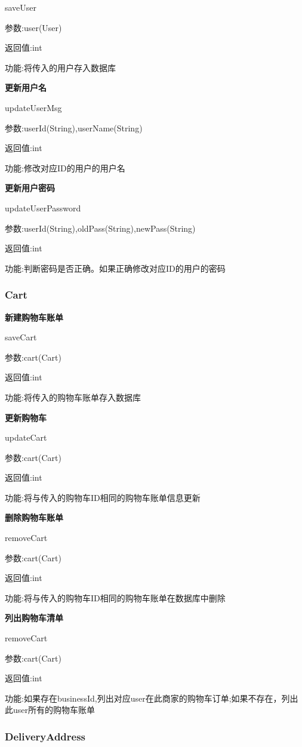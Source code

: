 saveUser

参数:user(User)

返回值:int

功能:将传入的用户存入数据库

\textbf{更新用户名}

updateUserMsg

参数:userId(String),userName(String)

返回值:int

功能:修改对应ID的用户的用户名

\textbf{更新用户密码}

updateUserPassword

参数:userId(String),oldPass(String),newPass(String)

返回值:int

功能:判断密码是否正确。如果正确修改对应ID的用户的密码

\subsubsection{Cart}
\textbf{新建购物车账单}

saveCart

参数:cart(Cart)

返回值:int

功能:将传入的购物车账单存入数据库

\textbf{更新购物车}

updateCart

参数:cart(Cart)

返回值:int

功能:将与传入的购物车ID相同的购物车账单信息更新

\textbf{删除购物车账单}

removeCart

参数:cart(Cart)

返回值:int

功能:将与传入的购物车ID相同的购物车账单在数据库中删除

\textbf{列出购物车清单}

removeCart

参数:cart(Cart)

返回值:int

功能:如果存在businessId,列出对应user在此商家的购物车订单;如果不存在，列出此user所有的购物车账单

\subsubsection{DeliveryAddress}

